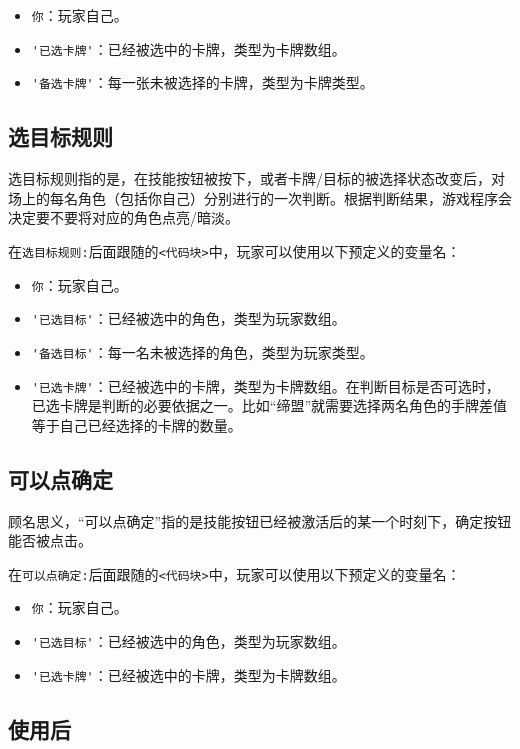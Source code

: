 \begin{itemize}
 \item \verb|你|：玩家自己。
 \item \verb|'已选卡牌'|：已经被选中的卡牌，类型为卡牌数组。
 \item \verb|'备选卡牌'|：每一张未被选择的卡牌，类型为卡牌类型。
\end{itemize}

\subsection{选目标规则}

选目标规则指的是，在技能按钮被按下，或者卡牌/目标的被选择状态改变后，对场上的每名角色（包括你自己）分别进行的一次判断。根据判断结果，游戏程序会决定要不要将对应的角色点亮/暗淡。

在\verb|选目标规则:|后面跟随的\verb|<代码块>|中，玩家可以使用以下预定义的变量名：

\begin{itemize}
 \item \verb|你|：玩家自己。
 \item \verb|'已选目标'|：已经被选中的角色，类型为玩家数组。
 \item \verb|'备选目标'|：每一名未被选择的角色，类型为玩家类型。
 \item \verb|'已选卡牌'|：已经被选中的卡牌，类型为卡牌数组。在判断目标是否可选时，已选卡牌是判断的必要依据之一。比如“缔盟”就需要选择两名角色的手牌差值等于自己已经选择的卡牌的数量。
\end{itemize}

\subsection{可以点确定}

顾名思义，“可以点确定”指的是技能按钮已经被激活后的某一个时刻下，确定按钮能否被点击。

在\verb|可以点确定:|后面跟随的\verb|<代码块>|中，玩家可以使用以下预定义的变量名：

\begin{itemize}
 \item \verb|你|：玩家自己。
 \item \verb|'已选目标'|：已经被选中的角色，类型为玩家数组。
 \item \verb|'已选卡牌'|：已经被选中的卡牌，类型为卡牌数组。
\end{itemize}

\subsection{使用后}

